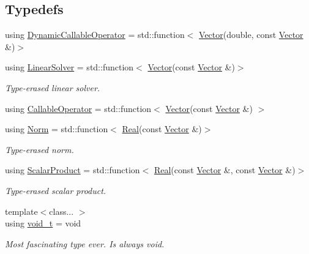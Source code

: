 \subsection*{Typedefs}
\begin{DoxyCompactItemize}
\item 
using \hyperlink{namespaceSpacy_a052e6b83b913fc316b0c2a2cd9535431}{Dynamic\+Callable\+Operator} = std\+::function$<$ \hyperlink{classSpacy_1_1Vector}{Vector}(double, const \hyperlink{classSpacy_1_1Vector}{Vector} \&)$>$
\item 
using \hyperlink{namespaceSpacy_adcd0d78166a9c972b8a2e5a689fc2d03}{Linear\+Solver} = std\+::function$<$ \hyperlink{classSpacy_1_1Vector}{Vector}(const \hyperlink{classSpacy_1_1Vector}{Vector} \&)$>$\hypertarget{namespaceSpacy_adcd0d78166a9c972b8a2e5a689fc2d03}{}\label{namespaceSpacy_adcd0d78166a9c972b8a2e5a689fc2d03}

\begin{DoxyCompactList}\small\item\em Type-\/erased linear solver. \end{DoxyCompactList}\item 
using \hyperlink{namespaceSpacy_a022a87afa759e18781dd2aea9a80cd73}{Callable\+Operator} = std\+::function$<$ \hyperlink{classSpacy_1_1Vector}{Vector}(const \hyperlink{classSpacy_1_1Vector}{Vector} \&) $>$
\item 
using \hyperlink{namespaceSpacy_a0dbe77a4e1282ef88017e94d50d17791}{Norm} = std\+::function$<$ \hyperlink{classSpacy_1_1Real}{Real}(const \hyperlink{classSpacy_1_1Vector}{Vector} \&)$>$
\begin{DoxyCompactList}\small\item\em Type-\/erased norm. \end{DoxyCompactList}\item 
using \hyperlink{namespaceSpacy_aa995526aa0e3fa58aca8dd6772311cad}{Scalar\+Product} = std\+::function$<$ \hyperlink{classSpacy_1_1Real}{Real}(const \hyperlink{classSpacy_1_1Vector}{Vector} \&, const \hyperlink{classSpacy_1_1Vector}{Vector} \&)$>$
\begin{DoxyCompactList}\small\item\em Type-\/erased scalar product. \end{DoxyCompactList}\item 
{\footnotesize template$<$class... $>$ }\\using \hyperlink{namespaceSpacy_a31be7cf4f499f7ee57b5730ff15115e8}{void\+\_\+t} = void\hypertarget{namespaceSpacy_a31be7cf4f499f7ee57b5730ff15115e8}{}\label{namespaceSpacy_a31be7cf4f499f7ee57b5730ff15115e8}

\begin{DoxyCompactList}\small\item\em Most fascinating type ever. Is always void. \end{DoxyCompactList}\end{DoxyCompactItemize}
